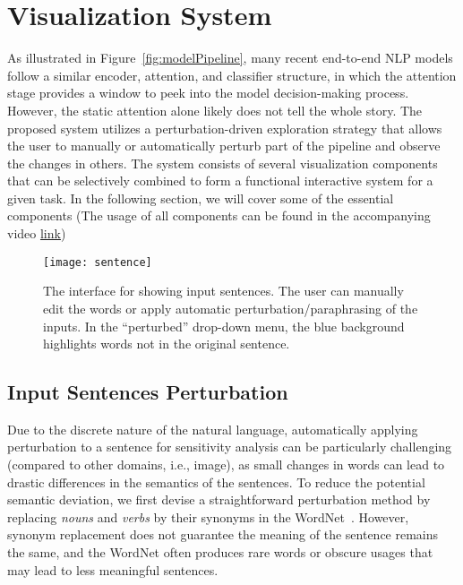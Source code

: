 
\section{Visualization System}
As illustrated in Figure~\ref{fig:modelPipeline}, many recent end-to-end NLP models follow a similar encoder, attention, and classifier structure, in which the attention stage provides a window to peek into the model decision-making process. 
However, the static attention alone likely does not tell the whole story. 
The proposed system utilizes a perturbation-driven exploration strategy that allows the user to manually or automatically perturb part of the pipeline and observe the changes in others.
%
The system consists of several visualization components that can be selectively combined to form a functional interactive system for a given task. In the following section, we will cover some of the essential components (The usage of all components can be found in the accompanying video \href{https://www.youtube.com/watch?v=PKiM4i0oIuY}{link})

\begin{figure}[htbp]
\centering
\vspace{-2mm}
 \texttt{[image: sentence]}
 \vspace{-2mm}
 \caption{
The interface for showing input sentences. The user can manually edit the words or apply automatic perturbation/paraphrasing of the inputs. In the ``perturbed'' drop-down menu, the blue background highlights words not in the original sentence.
 }
 \vspace{-1mm}
\label{fig:sentence}
\end{figure}

\subsection{Input Sentences Perturbation}
\label{sec:perturb}
Due to the discrete nature of the natural language, automatically applying perturbation to a sentence for sensitivity analysis can be particularly challenging (compared to other domains, i.e., image), as small changes in words can lead to drastic differences in the semantics of the sentences.
To reduce the potential semantic deviation, we first devise a straightforward perturbation method by replacing \emph{nouns} and \emph{verbs} by their synonyms in the WordNet~\cite{Miller1995}. However, synonym replacement does not guarantee the meaning of the sentence remains the same, and the WordNet often produces rare words or obscure usages that may lead to less meaningful sentences.

